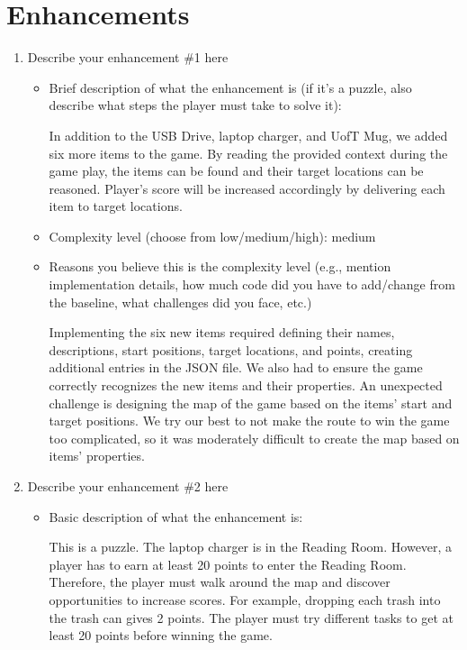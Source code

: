 \documentclass[11pt]{article}
\begin{document}
\section*{Enhancements}
\begin{enumerate}
    \item Describe your enhancement \#1 here
    \begin{itemize}
        \item Brief description of what the enhancement is (if it's a puzzle, also describe what steps the player must take to solve it):

        In addition to the USB Drive, laptop charger, and UofT Mug, we added six more items to the game. By reading the provided context during the game play, the items can be found and their target locations can be reasoned. Player's score will be increased accordingly by delivering each item to target locations.

        \item Complexity level (choose from low/medium/high): medium
        \item Reasons you believe this is the complexity level (e.g., mention implementation details, how much code did you have to add/change from the baseline, what challenges did you face, etc.)

        Implementing the six new items required defining their names, descriptions, start positions, target locations, and points, creating additional entries in the JSON file. We also had to ensure the game correctly recognizes the new items and their properties. An unexpected challenge is designing the map of the game based on the items' start and target positions. We try our best to not make the route to win the game too complicated, so it was moderately difficult to create the map based on items' properties.

    \end{itemize}

    \item Describe your enhancement \#2 here
    \begin{itemize}
       \item Basic description of what the enhancement is:

        This is a puzzle. The laptop charger is in the Reading Room. However, a player has to earn at least 20 points to enter the Reading Room. Therefore, the player must walk around the map and discover opportunities to increase scores. For example, dropping each trash into the trash can gives 2 points. The player must try different tasks to get at least 20 points before winning the game.


\end{itemize}
\end{enumerate}
\end{document}
